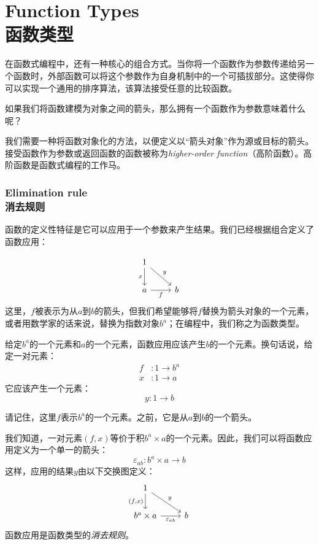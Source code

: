 \documentclass[DaoFP]{subfiles}
\begin{document}
 \setcounter{chapter}{5}

 \chapter{Function Types\\函数类型}

 在函数式编程中，还有一种核心的组合方式。当你将一个函数作为参数传递给另一个函数时，外部函数可以将这个参数作为自身机制中的一个可插拔部分。这使得你可以实现一个通用的排序算法，该算法接受任意的比较函数。

 如果我们将函数建模为对象之间的箭头，那么拥有一个函数作为参数意味着什么呢？

 我们需要一种将函数对象化的方法，以便定义以“箭头对象”作为源或目标的箭头。接受函数作为参数或返回函数的函数被称为\emph{higher-order function}（高阶函数）。高阶函数是函数式编程的工作马。

 \subsection{Elimination rule\\消去规则}

 函数的定义性特征是它可以应用于一个参数来产生结果。我们已经根据组合定义了函数应用：

 \[
  \begin{tikzcd}
   1
   \arrow[d, "x"']
   \arrow[rd, "y"]
   \\
   a
   \arrow[r, "f"']
   & b
  \end{tikzcd}
 \]
 这里，$f$被表示为从$a$到$b$的箭头，但我们希望能够将$f$替换为箭头对象的一个元素，或者用数学家的话来说，替换为指数对象$b^a$；在编程中，我们称之为函数类型。

 给定$b^a$的一个元素和$a$的一个元素，函数应用应该产生$b$的一个元素。换句话说，给定一对元素：
 \begin{align*}
  f &\colon 1 \to b^a \\
  x &\colon 1 \to a
 \end{align*}
 它应该产生一个元素：
 \[y \colon 1 \to b \]

 请记住，这里$f$表示$b^a$的一个元素。之前，它是从$a$到$b$的一个箭头。

 我们知道，一对元素$(f, x)$等价于积$b^a \times a$的一个元素。因此，我们可以将函数应用定义为一个单一的箭头：
 \[\varepsilon_{a b} \colon b^a \times a \to b\]
 这样，应用的结果$y$由以下交换图定义：
 \[
  \begin{tikzcd}
   1
   \arrow[d, "{(f, x)}"']
   \arrow[rd, "y"]
   \\
   b^a \times a
   \arrow[r, "\varepsilon_{a b}"']
   & b
  \end{tikzcd}
 \]
 函数应用是函数类型的\emph{消去规则}。
\end{document}
